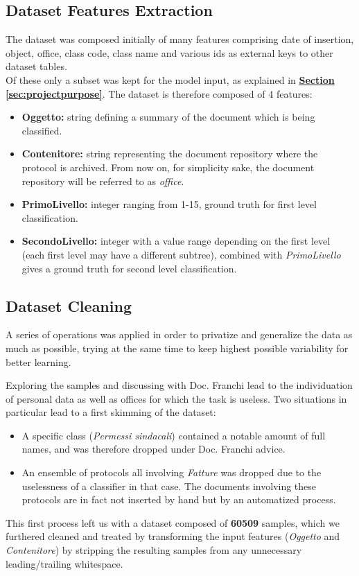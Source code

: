 \documentclass[12pt]{article}
\begin{document}
\subsection{Dataset Features Extraction}
The dataset was composed initially of many features comprising date of insertion, object, office, class code, class name and various ids as external keys to other dataset tables.\\Of these only a subset was kept for the model input, as explained in \hyperref[sec:projectpurpose]{\textbf{Section \ref{sec:projectpurpose}}}. The dataset is therefore composed of 4 features:
\begin{itemize}
    \item \textbf{Oggetto:} string defining a summary of the document which is being classified.
    \item \textbf{Contenitore:} string representing the document repository where the protocol is archived. From now on, for simplicity sake, the document repository will be referred to as \textit{office}.
    \item \textbf{PrimoLivello:} integer ranging from 1-15, ground truth for first level classification.
    \item \textbf{SecondoLivello:} integer with a value range depending on the first level (each first level may have a different subtree), combined with \textit{PrimoLivello} gives a ground truth for second level classification.
\end{itemize}

\subsection{Dataset Cleaning}
A series of operations was applied in order to privatize and generalize the data as much as possible, trying at the same time to keep highest possible variability for better learning.

Exploring the samples and discussing with Doc. Franchi lead to the individuation of personal data as well as offices for which the task is useless. Two situations in particular lead to a first skimming of the dataset:
\begin{itemize}
    \item A specific class (\textit{Permessi sindacali}) contained a notable amount of full names, and was therefore dropped under Doc. Franchi advice. 
    \item An ensemble of protocols all involving \textit{Fatture} was dropped due to the uselessness of a classifier in that case. The documents involving these protocols are in fact not inserted by hand but by an automatized process.
\end{itemize}
This first process left us with a dataset composed of \textbf{60509} samples, which we furthered cleaned and treated by transforming the input features (\textit{Oggetto} and \textit{Contenitore}) by stripping the resulting samples from any unnecessary leading/trailing whitespace. 
\end{document}
